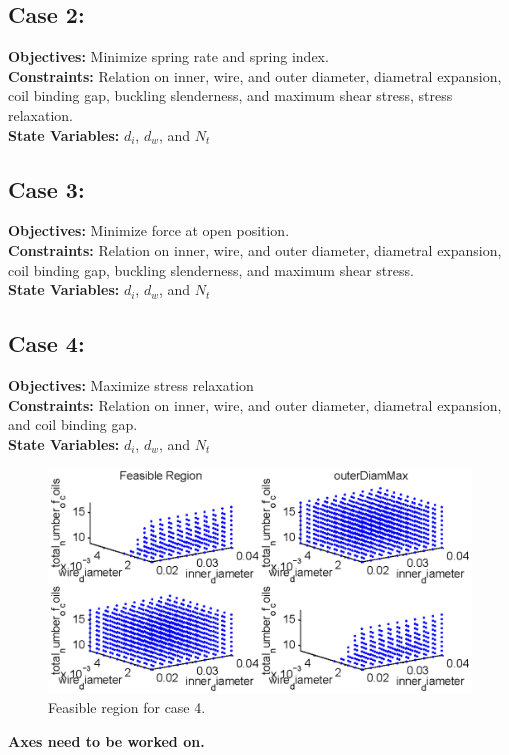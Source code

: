 \documentclass[10pt]{article}
\begin{document}
\newpage
\subsection{Case 2:}
\label{sec:Case2}

	\textbf{Objectives:} Minimize spring rate and spring index.\\
	\textbf{Constraints:} Relation on inner, wire, and outer diameter, diametral expansion, coil binding gap, buckling slenderness, and maximum shear stress, stress relaxation. \\
	\textbf{State Variables:} $d_{i}$, $d_{w}$, and $N_{t}$ \\

\newpage
\subsection{Case 3:}
\label{sec:Case3}
	\textbf{Objectives:} Minimize force at open position.\\
	\textbf{Constraints:} Relation on inner, wire, and outer diameter, diametral expansion, coil binding gap, buckling slenderness, and maximum shear stress. \\
	\textbf{State Variables:} $d_{i}$, $d_{w}$, and $N_{t}$ \\

\newpage
\subsection{Case 4:}
\label{sec:Case4} 

	
	\textbf{Objectives:} Maximize stress relaxation\\
	\textbf{Constraints:} Relation on inner, wire, and outer diameter, diametral expansion, and coil binding gap. \\
	\textbf{State Variables:} $d_{i}$, $d_{w}$, and $N_{t}$ \\



		\begin{figure}[h]
		 \begin{center}\includegraphics[scale=.75]{Case_11_348.eps}\end{center}
		 \caption{Feasible region for case 4.}
		 \label{Feasible Case 4}
		 
		 \end{figure}
 		\textbf{Axes need to be worked on.}
\end{document}
